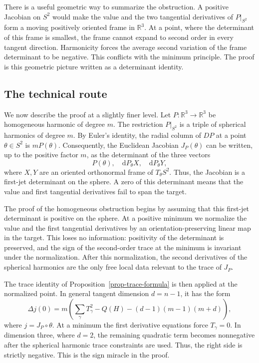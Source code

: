 \documentclass[10pt]{amsart}
\numberwithin{equation}{section}
\theoremstyle{definition}
\newcommand{\R}{\mathbb R}
\begin{document}
There is a useful geometric way to summarize the obstruction. A positive
Jacobian on \(S^2\) would make the value and the two tangential derivatives of
\(P|_{S^2}\) form a moving positively oriented frame in \(\R^3\). At a point,
where the determinant of this frame is smallest, the frame cannot expand to
second order in every tangent direction. Harmonicity forces the average second
variation of the frame determinant to be negative. This conflicts with the
minimum principle. The proof is this geometric picture written as a determinant
identity.


\subsection{The technical route}

We now describe the proof at a slightly finer level. Let \(P:\R^3\to\R^3\)
be homogeneous harmonic of degree \(m\). The restriction \(P|_{S^2}\) is a
triple of spherical harmonics of degree \(m\). By Euler's identity, the radial
column of \(DP\) at a point \(\theta\in S^2\) is \(mP(\theta)\). Consequently,
the Euclidean Jacobian \(J_P(\theta)\) can be written, up to the positive
factor \(m\), as the determinant of the three vectors
\[
        P(\theta),\quad \mathrm{d}P_\theta X,
        \quad \mathrm{d}P_\theta Y,
\]
where \(X,Y\) are an oriented orthonormal frame of \(T_\theta S^2\). Thus, the
Jacobian is a first-jet determinant on the sphere. A zero of this determinant
means that the value and first tangential derivatives fail to span the target.

The proof of the homogeneous obstruction begins by assuming that this
first-jet determinant is positive on the sphere. At a positive minimum we
normalize the value and the first tangential derivatives by an
orientation-preserving linear map in the target. This loses no information:
positivity of the determinant is preserved, and the sign of the second-order
trace at the minimum is invariant under the normalization. After this
normalization, the second derivatives of the spherical harmonics are the only
free local data relevant to the trace of \(J_P\).

The trace identity of Proposition~\ref{prop-trace-formula} is then applied at
the normalized point. In general tangent dimension \(d=n-1\), it has the form
\[
        \Delta j(0)
        =m\left(\sum_\gamma T_\gamma^2-Q(H)-(d-1)(m-1)(m+d)\right),
\]
where \(j=J_P\circ\theta\). At a minimum the first derivative equations force
\(T_\gamma=0\). In dimension three, where \(d=2\), the remaining quadratic
term becomes nonnegative after the spherical harmonic trace constraints are
used. Thus, the right side is strictly negative. This is the sign miracle in
the proof.
\end{document}
